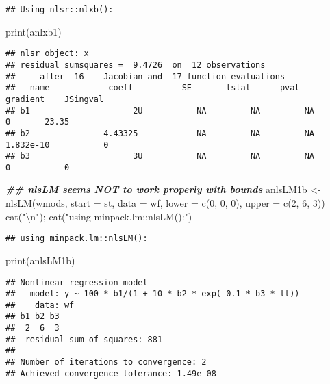 \documentclass[
]{article}
\newenvironment{Shaded}{\begin{snugshade}}{\end{snugshade}}
\newcommand{\AttributeTok}[1]{\textcolor[rgb]{0.77,0.63,0.00}{#1}}
\newcommand{\DecValTok}[1]{\textcolor[rgb]{0.00,0.00,0.81}{#1}}
\newcommand{\DocumentationTok}[1]{\textcolor[rgb]{0.56,0.35,0.01}{\textbf{\textit{#1}}}}
\newcommand{\FunctionTok}[1]{\textcolor[rgb]{0.00,0.00,0.00}{#1}}
\newcommand{\NormalTok}[1]{#1}
\newcommand{\OtherTok}[1]{\textcolor[rgb]{0.56,0.35,0.01}{#1}}
\newcommand{\SpecialCharTok}[1]{\textcolor[rgb]{0.00,0.00,0.00}{#1}}
\newcommand{\StringTok}[1]{\textcolor[rgb]{0.31,0.60,0.02}{#1}}
\begin{document}
\begin{verbatim}
## Using nlsr::nlxb():
\end{verbatim}

\begin{Shaded}
\begin{Highlighting}[]
\FunctionTok{print}\NormalTok{(anlxb1)}
\end{Highlighting}
\end{Shaded}

\begin{verbatim}
## nlsr object: x 
## residual sumsquares =  9.4726  on  12 observations
##     after  16    Jacobian and  17 function evaluations
##   name            coeff          SE       tstat      pval      gradient    JSingval   
## b1                     2U           NA         NA         NA           0       23.35  
## b2               4.43325            NA         NA         NA   1.832e-10           0  
## b3                     3U           NA         NA         NA           0           0
\end{verbatim}

\begin{Shaded}
\begin{Highlighting}[]
\DocumentationTok{\#\# nlsLM seems NOT to work properly with bounds}
\NormalTok{anlsLM1b }\OtherTok{\textless{}{-}} \FunctionTok{nlsLM}\NormalTok{(wmods, }\AttributeTok{start =}\NormalTok{ st, }\AttributeTok{data =}\NormalTok{ wf, }\AttributeTok{lower =} \FunctionTok{c}\NormalTok{(}\DecValTok{0}\NormalTok{, }\DecValTok{0}\NormalTok{, }\DecValTok{0}\NormalTok{), }\AttributeTok{upper =} \FunctionTok{c}\NormalTok{(}\DecValTok{2}\NormalTok{, }\DecValTok{6}\NormalTok{, }\DecValTok{3}\NormalTok{))}
\FunctionTok{cat}\NormalTok{(}\StringTok{"}\SpecialCharTok{\textbackslash{}n}\StringTok{"}\NormalTok{); }\FunctionTok{cat}\NormalTok{(}\StringTok{"using minpack.lm::nlsLM():"}\NormalTok{)}
\end{Highlighting}
\end{Shaded}

\begin{verbatim}
## using minpack.lm::nlsLM():
\end{verbatim}

\begin{Shaded}
\begin{Highlighting}[]
\FunctionTok{print}\NormalTok{(anlsLM1b)}
\end{Highlighting}
\end{Shaded}

\begin{verbatim}
## Nonlinear regression model
##   model: y ~ 100 * b1/(1 + 10 * b2 * exp(-0.1 * b3 * tt))
##    data: wf
## b1 b2 b3 
##  2  6  3 
##  residual sum-of-squares: 881
## 
## Number of iterations to convergence: 2 
## Achieved convergence tolerance: 1.49e-08
\end{verbatim}
\end{document}
